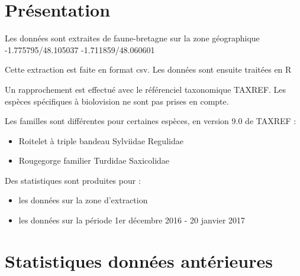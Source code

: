 \renewcommand{\monlhead}{Données ornitho faune-bretagne}
\section*{Présentation}
Les données sont extraites de faune-bretagne sur la zone géographique -1.775795/48.105037 -1.711859/48.060601

Cette extraction est faite en format csv. Les données sont ensuite traitées en R

Un rapprochement est effectué avec le référenciel taxonomique TAXREF.
Les espèces spécifiques à biolovision ne sont pas prises en compte.

Les familles sont différentes pour certaines espèces, en version 9.0 de TAXREF :
\begin{itemize}
\item Roitelet à triple bandeau   Sylviidae   Regulidae
\item Rougegorge familier    Turdidae Saxicolidae
\end{itemize}

Des statistiques sont produites pour :
\begin{itemize}
\item les données sur la zone d'extraction
\item les données sur la période 1er décembre 2016 - 20 janvier 2017
\end{itemize}
\section*{Statistiques données antérieures}
